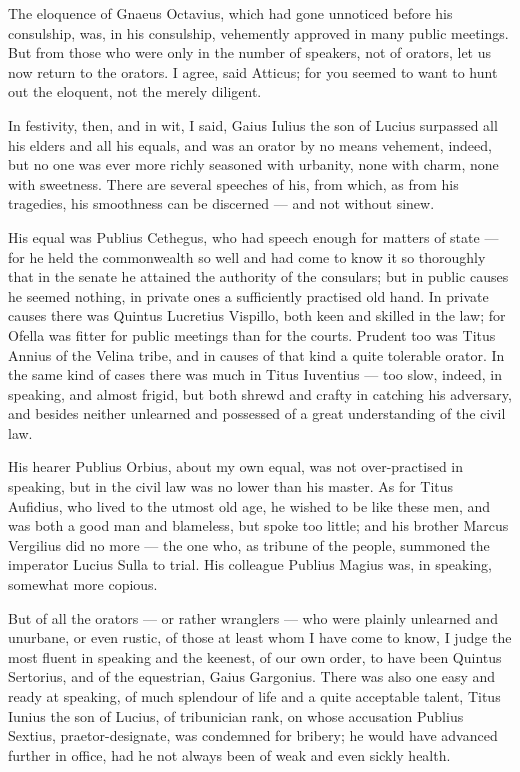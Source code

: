  The eloquence of Gnaeus Octavius, which had gone unnoticed before his consulship, was, in his consulship, vehemently approved in many public meetings. But from those who were only in the number of speakers, not of orators, let us now return to the orators. I agree, said Atticus; for you seemed to want to hunt out the eloquent, not the merely diligent.

 In festivity, then, and in wit, I said, Gaius Iulius the son of Lucius surpassed all his elders and all his equals, and was an orator by no means vehement, indeed, but no one was ever more richly seasoned with urbanity, none with charm, none with sweetness. There are several speeches of his, from which, as from his tragedies, his smoothness can be discerned — and not without sinew.

 His equal was Publius Cethegus, who had speech enough for matters of state — for he held the commonwealth so well and had come to know it so thoroughly that in the senate he attained the authority of the consulars; but in public causes he seemed nothing, in private ones a sufficiently practised old hand. In private causes there was Quintus Lucretius Vispillo, both keen and skilled in the law; for Ofella was fitter for public meetings than for the courts. Prudent too was Titus Annius of the Velina tribe, and in causes of that kind a quite tolerable orator. In the same kind of cases there was much in Titus Iuventius — too slow, indeed, in speaking, and almost frigid, but both shrewd and crafty in catching his adversary, and besides neither unlearned and possessed of a great understanding of the civil law.

 His hearer Publius Orbius, about my own equal, was not over-practised in speaking, but in the civil law was no lower than his master. As for Titus Aufidius, who lived to the utmost old age, he wished to be like these men, and was both a good man and blameless, but spoke too little; and his brother Marcus Vergilius did no more — the one who, as tribune of the people, summoned the imperator Lucius Sulla to trial. His colleague Publius Magius was, in speaking, somewhat more copious.

 But of all the orators — or rather wranglers — who were plainly unlearned and unurbane, or even rustic, of those at least whom I have come to know, I judge the most fluent in speaking and the keenest, of our own order, to have been Quintus Sertorius, and of the equestrian, Gaius Gargonius. There was also one easy and ready at speaking, of much splendour of life and a quite acceptable talent, Titus Iunius the son of Lucius, of tribunician rank, on whose accusation Publius Sextius, praetor-designate, was condemned for bribery; he would have advanced further in office, had he not always been of weak and even sickly health.

